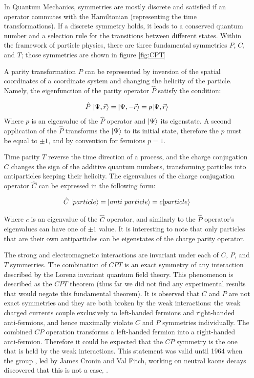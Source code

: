In Quantum Mechanics, symmetries are mostly discrete and satisfied if an operator commutes with the Hamiltonian (representing the time transformations). If a discrete symmetry holds, it leads to a conserved quantum number and a selection rule for the transitions between different states. 
Within the framework of particle physics, there are three fundamental symmetries $P$, $C$, and $T$; those symmetries are shown in figure \ref{fig:CPT}

A parity transformation $P$ can be represented by inversion of the spatial coordinates of a coordinate system and changing the helicity of the particle. Namely, the eigenfunction of the parity operator $  \hat{P}$ satisfy the condition: 

\begin{equation}
    \hat{P}~ \lvert\Psi, \vec{r}\rangle = \lvert\Psi, - \vec{r}\rangle = p \lvert\Psi, \vec{r}\rangle  
\end{equation}
Where $p$ is an eigenvalue of the $ \hat{P}$ operator and $\lvert\Psi\rangle$ its eigenstate. A second application of the $\hat{P}$ transforms the $\lvert\Psi\rangle$ to its initial state, therefore the $p$ must be equal to $\pm 1$, and by convention for fermions $p=1$.  


Time parity $T$ reverse the time direction of a process, and the charge conjugation $C$ changes the sign of the additive quantum numbers, transforming particles into antiparticles keeping their helicity. The eigenvalues of the  charge conjugation operator $\hat{C}$ can be expressed in the following form:
 

\begin{equation}
    \hat{C}~ \lvert particle\rangle = \lvert anti~ particle\rangle = c \lvert particle\rangle  
\end{equation}

Where $c$ is an eigenvalue of the $ \hat{C}$ operator, and similarly to the $\hat{P}$ operator's eigenvalues can have one of $\pm 1$ value. It is interesting to note that only particles that
are their own antiparticles can be eigenstates of the charge parity operator.

The strong and electromagnetic interactions are invariant under each of $C$, $P$, and $T$ symmetries.  The combination of $CPT$ is an exact symmetry of any interaction described by the Lorenz invariant quantum field theory. This phenomenon is described as the $CPT$ theorem \cite{CPT_theorm} (thus far we did not find any experimental results that would negate this fundamental theorem).
It is observed that $C$ and $P$ are not exact symmetries and they are both broken by the weak interactions: the weak charged currents couple exclusively to left-handed fermions and right-handed anti-fermions, and hence maximally violate $C$ and $P$ symmetries individually. The combined $CP$ operation transforms a left-handed fermion into a right-handed anti-fermion. Therefore it could be expected that the $CP$ symmetry is the one that is held by the weak interactions. This statement was valid until 1964 when the group , led by James Cronin and Val Fitch, working on neutral kaons decays discovered that this is not a case, \cite{CPV_kaons}. 

